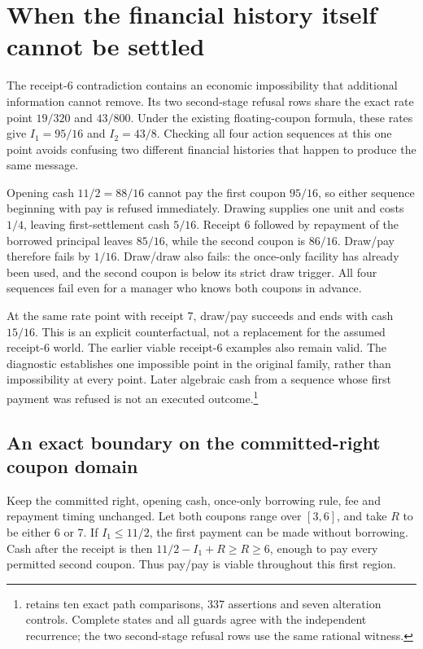 \section{When the financial history itself cannot be settled}
\label{sim:financing-viability-boundary}

The receipt-6 contradiction contains an economic impossibility that additional information cannot remove. Its two second-stage refusal rows share the exact rate point $19/320$ and $43/800$. Under the existing floating-coupon formula, these rates give $I_1=95/16$ and $I_2=43/8$. Checking all four action sequences at this one point avoids confusing two different financial histories that happen to produce the same message.

Opening cash $11/2=88/16$ cannot pay the first coupon $95/16$, so either sequence beginning with pay is refused immediately. Drawing supplies one unit and costs $1/4$, leaving first-settlement cash $5/16$. Receipt 6 followed by repayment of the borrowed principal leaves $85/16$, while the second coupon is $86/16$. Draw/pay therefore fails by $1/16$. Draw/draw also fails: the once-only facility has already been used, and the second coupon is below its strict draw trigger. All four sequences fail even for a manager who knows both coupons in advance.

At the same rate point with receipt 7, draw/pay succeeds and ends with cash $15/16$. This is an explicit counterfactual, not a replacement for the assumed receipt-6 world. The earlier viable receipt-6 examples also remain valid. The diagnostic establishes one impossible point in the original family, rather than impossibility at every point. Later algebraic cash from a sequence whose first payment was refused is not an executed outcome.\footnote{ retains ten exact path comparisons, 337 assertions and seven alteration controls. Complete states and all guards agree with the independent recurrence; the two second-stage refusal rows use the same rational witness.}

\subsection{An exact boundary on the committed-right coupon domain}

Keep the committed right, opening cash, once-only borrowing rule, fee and repayment timing unchanged. Let both coupons range over $[3,6]$, and take $R$ to be either 6 or 7. If $I_1\le 11/2$, the first payment can be made without borrowing. Cash after the receipt is then $11/2-I_1+R\ge R\ge6$, enough to pay every permitted second coupon. Thus pay/pay is viable throughout this first region.

